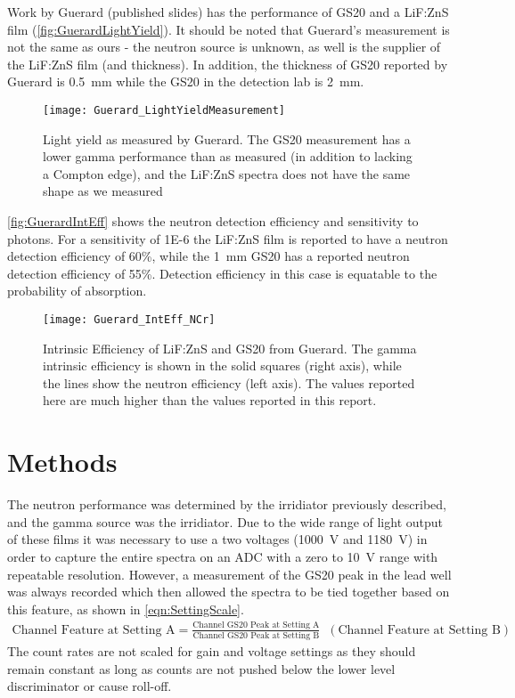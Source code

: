\documentclass[onecolumn]{IEEEtran}
\begin{document}
Work by Guerard (published slides) has the performance of GS20 and a LiF:ZnS film (\autoref{fig:GuerardLightYield}).
It should be noted that Guerard's measurement is not the same as ours - the neutron source is unknown, as well is the supplier of the LiF:ZnS film (and thickness). 
In addition, the thickness of GS20 reported by Guerard is \SI{0.5}{\mm} while the GS20 in the detection lab is \SI{2}{\mm}.
\begin{figure}
  \centering
  \texttt{[image: Guerard\_LightYieldMeasurement]}
  \caption[Measured Light Yield (Guerard)]{Light yield as measured by Guerard. The GS20 measurement has a lower gamma performance than as measured (in addition to lacking a Compton edge), and the LiF:ZnS  spectra does not have the same shape as we measured}
	\label{fig:GuerardLightYield}
\end{figure}
\autoref{fig:GuerardIntEff} shows the neutron detection efficiency and sensitivity to  photons.
For a sensitivity of \num{1E-6} the LiF:ZnS film is reported to have a neutron detection efficiency of 60\%, while the \SI{1}{\mm} GS20 has a reported neutron detection efficiency of 55\%.
Detection efficiency in this case is equatable to the probability of absorption.
\begin{figure}
  \centering
  \texttt{[image: Guerard\_IntEff\_NCr]}
  \caption[Intrinsic Efficiency (Geurard)]{Intrinsic Efficiency of LiF:ZnS and GS20 from Guerard.  The gamma intrinsic efficiency is shown in the solid squares (right axis), while the lines show the neutron efficiency (left axis). The values reported here are much higher than the values reported in this report.}
	\label{fig:GuerardIntEff}
\end{figure}

\section{Methods}
The neutron performance was determined by the  irridiator previously described, and the gamma source was the  irridiator.
Due to the wide range of light output of these films it was necessary to use a two voltages (\SI{1000}{\volt} and \SI{1180}{\volt}) in order to capture the entire spectra on an ADC with a zero to \SI{10}{\volt} range with repeatable resolution.
However, a measurement of the GS20 peak in the lead well was always recorded which then allowed the spectra to be tied together based on this feature, as shown in \autoref{eqn:SettingScale}.
\begin{align}
  \label{eqn:SettingScale}
  \text{Channel Feature at Setting A} = \frac{\text{Channel GS20 Peak at Setting A}}{\text{Channel GS20 Peak at Setting B}} \;\; \left( \text{Channel Feature at Setting B}\right)
\end{align}
The count rates are not scaled for gain and voltage settings as they should remain constant as long as counts are not pushed below the lower level discriminator or cause roll-off.
\end{document}
